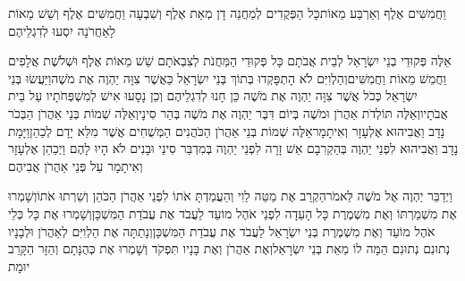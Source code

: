 \documentclass[../main/main.tex]{subfiles}
\begin{document}
\begin{multicols*}{\ncols}
וַחֲמִשִּׁים אֶלֶף וְאַרְבַּע מֵאוֹת\PreVerseSpace{}כָּל הַפְּקֻדִים לְמַחֲנֵה דָן מְאַת אֶלֶף וְשִׁבְעָה וַחֲמִשִּׁים אֶלֶף וְשֵׁשׁ מֵאוֹת לָאַחֲרֹנָה יִסְעוּ לְדִגְלֵיהֶם\OpenSection{}\par
{}אֵלֶּה פְּקוּדֵי בְנֵי יִשְׂרָאֵל לְבֵית אֲבֹתָם כָּל פְּקוּדֵי הַמַּחֲנֹת לְצִבְאֹתָם שֵׁשׁ מֵאוֹת אֶלֶף וּשְׁלֹשֶׁת אֲלָפִים וַחֲמֵשׁ מֵאוֹת וַחֲמִשִּׁים\PreVerseSpace{}וְהַלְוִיִּם לֹא הָתְפָּקְדוּ בְּתוֹךְ בְּנֵי יִשְׂרָאֵל כַּאֲשֶׁר צִוָּה יַהְוֶה אֶת מֹשֶׁה\PreVerseSpace{}וַיַּעֲשׂוּ בְּנֵי יִשְׂרָאֵל כְּכֹל אֲשֶׁר צִוָּה יַהְוֶה אֶת מֹשֶׁה כֵּן חָנוּ לְדִגְלֵיהֶם וְכֵן נָסָעוּ אִישׁ לְמִשְׁפְּחֹתָיו עַל בֵּית אֲבֹתָיו\PreChapterSpace{}וְאֵלֶּה תּוֹלְדֹת אַהֲרֹן וּמֹשֶׁה בְּיוֹם דִּבֶּר יַהְוֶה אֶת מֹשֶׁה בְּהַר סִינָי\PreVerseSpace{}וְאֵלֶּה שְׁמוֹת בְּנֵי אַהֲרֹן הַבְּכֹר נָדָב וַאֲבִיהוּא אֶלְעָזָר וְאִיתָמָר\PreVerseSpace{}אֵלֶּה שְׁמוֹת בְּנֵי אַהֲרֹן הַכֹּהֲנִים הַמְּשֻׁחִים אֲשֶׁר מִלֵּא יָדָם לְכַהֵן\PreVerseSpace{}וַיָּמָת נָדָב וַאֲבִיהוּא לִפְנֵי יַהְוֶה בְּהַקְרִבָם אֵשׁ זָרָה לִפְנֵי יַהְוֶה בְּמִדְבַּר סִינַי וּבָנִים לֹא הָיוּ לָהֶם וַיְכַהֵן אֶלְעָזָר וְאִיתָמָר עַל פְּנֵי אַהֲרֹן אֲבִיהֶם\OpenSection{}\par
{}וַיְדַבֵּר יַהְוֶה אֶל מֹשֶׁה לֵּאמֹר\PreVerseSpace{}הַקְרֵב אֶת מַטֵּה לֵוִי וְהַעֲמַדְתָּ אֹתוֹ לִפְנֵי אַהֲרֹן הַכֹּהֵן וְשֵׁרְתוּ אֹתוֹ\PreVerseSpace{}וְשָׁמְרוּ אֶת מִשְׁמַרְתּוֹ וְאֶת מִשְׁמֶרֶת כָּל הָעֵדָה לִפְנֵי אֹהֶל מוֹעֵד לַעֲבֹד אֶת עֲבֹדַת הַמִּשְׁכָּן\PreVerseSpace{}וְשָׁמְרוּ אֶת כָּל כְּלֵי אֹהֶל מוֹעֵד וְאֶת מִשְׁמֶרֶת בְּנֵי יִשְׂרָאֵל לַעֲבֹד אֶת עֲבֹדַת הַמִּשְׁכָּן\PreVerseSpace{}וְנָתַתָּה אֶת הַלְוִיִּם לְאַהֲרֹן וּלְבָנָיו נְתוּנִם נְתוּנִם הֵמָּה לוֹ מֵאֵת בְּנֵי יִשְׂרָאֵל\PreVerseSpace{}וְאֶת אַהֲרֹן וְאֶת בָּנָיו תִּפְקֹד וְשָׁמְרוּ אֶת כְּהֻנָּתָם וְהַזָּר הַקָּרֵב יוּמָת\OpenSection{}\par

\end{multicols*}
\end{document}
